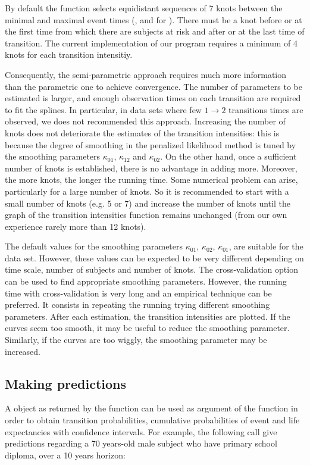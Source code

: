 \documentclass[article]{jss}
\begin{document}
By default the function  selects equidistant sequences of 7
knots between the minimal and maximal event times (, 
and  for ). There must be a knot before or at
the first time from which there are subjects at risk and after or at
the last time of transition. The current implementation of our program
requires a minimum of 4 knots for each transition intensitiy.


Consequently, the semi-parametric approach
requires much more information than the parametric one to achieve
convergence. The number of parameters to be estimated is larger, and
enough observation times on each transition are required to fit the
splines.  In particular, in data sets where few \(1 \rightarrow 2\)
transitions times are observed, we does not recommended this approach.
Increasing the number of knots does not deteriorate the estimates of
the transition intensities: this is because the degree of smoothing in
the penalized likelihood method is tuned by the smoothing parameters
\(\kappa_{01}\), \(\kappa_{12}\) and \(\kappa_{02}\).  On the other hand,
once a sufficient number of knots is established, there is no
advantage in adding more.  Moreover, the more knots, the longer the
running time.  Some numerical problem can arise, particularly for a
large number of knots. 
So it is recommended to start with a small number of
knots (e.g. 5 or 7) and increase the number of knots until the graph
of the transition intensities function remains unchanged (from our own
experience rarely more than 12 knots).

The default values for the smoothing parameters \(\kappa_{01}\), \(\kappa_{02}\), 
\(\kappa_{01}\), are suitable for the
 data set. However, these values can be expected to be
very different depending on time scale, number of subjects and number of knots. 
The cross-validation option can be used to find appropriate smoothing parameters.
However, the running time with cross-validation is very long and an empirical
technique can be preferred. It consists in repeating the  running
trying different smoothing parameters.  After each estimation, the
transition intensities are plotted. 
If the curves seem too smooth, it may be useful
to reduce the smoothing parameter. Similarly, if the curves
are too wiggly, the smoothing parameter may be increased.

\subsection{Making predictions}
\label{sec-5-4}
A object as returned by the  function 
can be used as argument of the  function in
order to obtain transition probabilities, cumulative probabilities of event and 
life expectancies with confidence intervals. 
For example, the following call give predictions regarding 
a 70 years-old male subject who have primary school diploma, 
over a 10 years horizon: 
\end{document}
